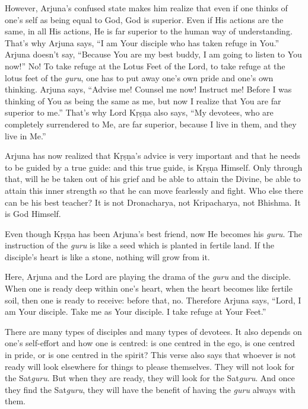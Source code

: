 However, Arjuna’s confused state makes him realize that even if one thinks of one’s self as being equal to God, God is superior. Even if His actions are the same, in all His actions, He is far superior to the human way of understanding. That’s why Arjuna says, “I am Your disciple who has taken refuge in You.” Arjuna doesn’t say, “Because You are my best buddy, I am going to listen to You now!” No! To take refuge at the Lotus Feet of the Lord, to take refuge at the lotus feet of the \textit{guru}, one has to put away one’s own pride and one’s own thinking. Arjuna says, “Advise me! Counsel me now! Instruct me! Before I was thinking of You as being the same as me, but now I realize that You are far superior to me.” That’s why Lord Kṛṣṇa also says, “My devotees, who are completely surrendered to Me, are far superior, because I live in them, and they live in Me.”

Arjuna has now realized that Kṛṣṇa’s advice is very important and that he needs to be guided by a true guide: and this true guide, is Kṛṣṇa Himself. Only through that, will he be taken out of his grief and be able to attain the Divine, be able to attain this inner strength so that he can move fearlessly and fight. Who else there can be his best teacher? It is not Dronacharya, not Kripacharya, not Bhishma. It is God Himself.

Even though Kṛṣṇa has been Arjuna’s best friend, now He becomes his \textit{guru}. The instruction of the \textit{guru} is like a seed which is planted in fertile land. If the disciple’s heart is like a stone, nothing will grow from it. 

Here, Arjuna and the Lord are playing the drama of the \textit{guru} and the disciple. When one is ready deep within one’s heart, when the heart becomes like fertile soil, then one is ready to receive: before that, no. Therefore Arjuna says, “Lord, I am Your disciple. Take me as Your disciple. I take refuge at Your Feet.”

There are many types of disciples and many types of devotees. It also depends on one’s self-effort and how one is centred: is one centred in the ego, is one centred in pride, or is one centred in the spirit? This verse also says that whoever is not ready will look elsewhere for things to please themselves. They will not look for the Sat\textit{guru}. But when they are ready, they will look for the Sat\textit{guru}. And once they find the Sat\textit{guru}, they will have the benefit of having the \textit{guru} always with them.

